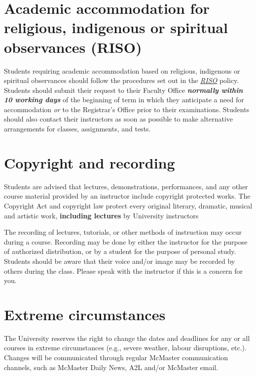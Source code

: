 \documentclass[12pt]{article}
\begin{document}
\section*{Academic accommodation for religious, indigenous or spiritual observances (RISO)}

Students requiring academic accommodation based on religious, indigenous
or spiritual observances should follow the procedures set out in the
\href{https://secretariat.mcmaster.ca/app/uploads/2019/02/Academic-Accommodation-for-Religious-Indigenous-and-Spiritual-Observances-Policy-on.pdf}{\emph{RISO}}
policy. Students should submit their request to their Faculty Office
\emph{\textbf{normally within 10 working days}} of the beginning of term
in which they anticipate a need for accommodation \emph{or} to the
Registrar's Office prior to their examinations. Students should also
contact their instructors as soon as possible to make alternative
arrangements for classes, assignments, and tests.

\section*{Copyright and recording}

Students are advised that lectures, demonstrations, performances, and
any other course material provided by an instructor include copyright
protected works. The Copyright Act and copyright law protect every
original literary, dramatic, musical and artistic work,
\textbf{including lectures} by University instructors

The recording of lectures, tutorials, or other methods of instruction
may occur during a course. Recording may be done by either the
instructor for the purpose of authorized distribution, or by a student
for the purpose of personal study. Students should be aware that their
voice and/or image may be recorded by others during the class. Please
speak with the instructor if this is a concern for you.


\section*{Extreme circumstances}

The University reserves the right to change the dates and deadlines for
any or all courses in extreme circumstances (e.g., severe weather,
labour disruptions, etc.). Changes will be communicated through regular
McMaster communication channels, such as McMaster Daily News, A2L and/or
McMaster email.
\end{document}
